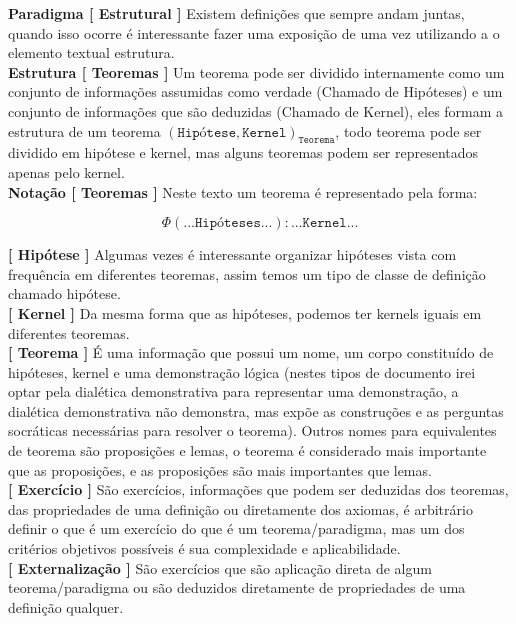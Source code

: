 \textbf{Paradigma [ Estrutural ]} Existem definições que sempre andam juntas, quando isso ocorre é interessante fazer uma exposição de uma vez utilizando a o elemento textual estrutura. \\

\textbf{Estrutura [ Teoremas ]} Um teorema pode ser dividido internamente como um conjunto de informações assumidas como verdade (Chamado de Hipóteses)  e um conjunto de informações que são deduzidas (Chamado de Kernel), eles formam a estrutura de um teorema $(\texttt{Hipótese}, \texttt{Kernel})_{\texttt{Teorema}}$, todo teorema pode ser dividido em hipótese e kernel, mas alguns teoremas podem ser representados apenas pelo kernel.\\

\textbf{Notação [ Teoremas ]} Neste texto um teorema é representado pela forma:

$$\Phi(\texttt{...Hipóteses...}) : \texttt{...Kernel...}$$

\textbf{[ Hipótese ]} Algumas vezes é interessante organizar hipóteses vista com frequência em diferentes teoremas, assim temos um tipo de classe de definição chamado hipótese.\\

\textbf{[ Kernel ]} Da mesma forma que as hipóteses, podemos ter kernels iguais em diferentes teoremas.\\

\textbf{[ Teorema ]} É uma informação que possui um nome, um corpo constituído de hipóteses, kernel e uma demonstração lógica (nestes tipos de documento irei optar pela dialética demonstrativa para representar uma demonstração, a dialética demonstrativa não demonstra, mas expõe as construções e as perguntas socráticas necessárias para resolver o teorema). Outros nomes para equivalentes de teorema são proposições e lemas, o teorema é considerado mais importante que as proposições, e as proposições são mais importantes que lemas. \\

\textbf{[ Exercício ]} São exercícios, informações que podem ser deduzidas dos teoremas, das propriedades de uma definição ou diretamente dos axiomas, é arbitrário definir o que é um exercício do que é um teorema/paradigma, mas um dos critérios objetivos possíveis é sua complexidade e aplicabilidade.\\

\textbf{[ Externalização ]} São exercícios que são aplicação direta de algum teorema/paradigma ou são deduzidos diretamente de propriedades de uma definição qualquer.\\

